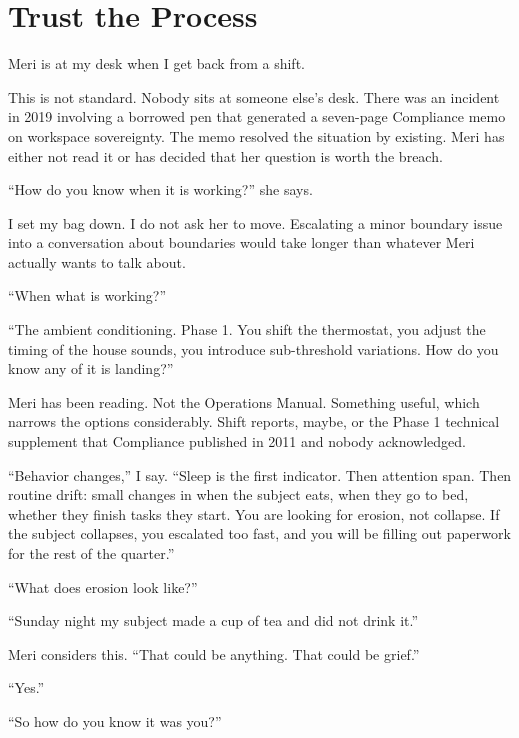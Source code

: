 
\chapter{Trust the Process}

Meri is at my desk when I get back from a shift.

This is not standard. Nobody sits at someone else's desk. There was an incident in 2019 involving a borrowed pen that generated a seven-page Compliance memo on workspace sovereignty. The memo resolved the situation by existing. Meri has either not read it or has decided that her question is worth the breach.

``How do you know when it is working?'' she says.

I set my bag down. I do not ask her to move. Escalating a minor boundary issue into a conversation about boundaries would take longer than whatever Meri actually wants to talk about.

``When what is working?''

``The ambient conditioning. Phase 1. You shift the thermostat, you adjust the timing of the house sounds, you introduce sub-threshold variations. How do you know any of it is landing?''

Meri has been reading. Not the Operations Manual. Something useful, which narrows the options considerably. Shift reports, maybe, or the Phase 1 technical supplement that Compliance published in 2011 and nobody acknowledged.

``Behavior changes,'' I say. ``Sleep is the first indicator. Then attention span. Then routine drift: small changes in when the subject eats, when they go to bed, whether they finish tasks they start. You are looking for erosion, not collapse. If the subject collapses, you escalated too fast, and you will be filling out paperwork for the rest of the quarter.''

``What does erosion look like?''

``Sunday night my subject made a cup of tea and did not drink it.''

Meri considers this. ``That could be anything. That could be grief.''

``Yes.''

``So how do you know it was you?''

